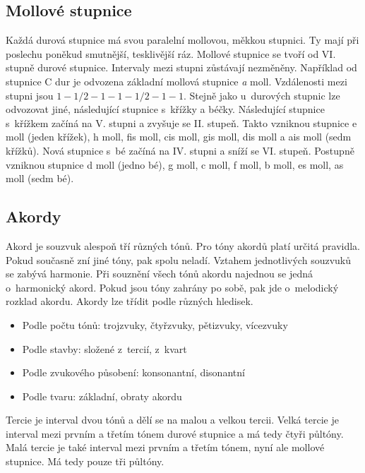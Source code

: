 \subsection{Mollové stupnice}
Každá durová stupnice má svou paralelní mollovou, měkkou stupnici.
Ty mají při poslechu poněkud smutnější, tesklivější ráz.
Mollové stupnice se tvoří od VI. stupně durové stupnice.
Intervaly mezi stupni zůstávají nezměněny.
Například od stupnice C dur je odvozena základní mollová stupnice \emph{a} moll.
Vzdálenosti mezi stupni jsou $1 - 1/2 - 1 - 1 - 1/2 - 1 - 1$.
Stejně jako u~durových stupnic lze odvozovat jiné, 
následující stupnice s~křížky a béčky.
Následující stupnice s~křížkem začíná na V. stupni a zvyšuje se II. stupeň.
Takto vzniknou stupnice e moll (jeden křížek), h moll, fis moll, cis moll, gis moll, dis moll a ais moll (sedm křížků).
Nová stupnice s~bé začíná na IV. stupni a sníží se VI. stupeň.
Postupně vzniknou stupnice d moll (jedno bé), g moll, c moll, f moll, b moll, es moll, as moll (sedm bé).
\cite{kofron}
\par

\subsection{Akordy}
Akord je souzvuk alespoň tří různých tónů.
Pro tóny akordů platí určitá pravidla.
Pokud současně zní jiné tóny, pak spolu neladí.
Vztahem jednotlivých souzvuků se zabývá harmonie.
Při souznění všech tónů akordu najednou se jedná o~harmonický akord.
Pokud jsou tóny zahrány po sobě, pak jde o~melodický rozklad akordu.
Akordy lze třídit podle různých hledisek.
\cite{zenkl}

\begin{itemize}
    \item Podle počtu tónů: trojzvuky, čtyřzvuky, pětizvuky, vícezvuky
    \item Podle stavby: složené z~tercií, z~kvart
    \item Podle zvukového působení: konsonantní, disonantní
    \item Podle tvaru: základní, obraty akordu
\end{itemize}

Tercie je interval dvou tónů a dělí se na malou a velkou tercii.
Velká tercie je interval mezi prvním a třetím tónem durové stupnice 
a má tedy čtyři půltóny.
Malá tercie je také interval mezi prvním a třetím tónem, nyní ale mollové stupnice.
Má tedy pouze tři půltóny.
\cite{zenkl}
\par


